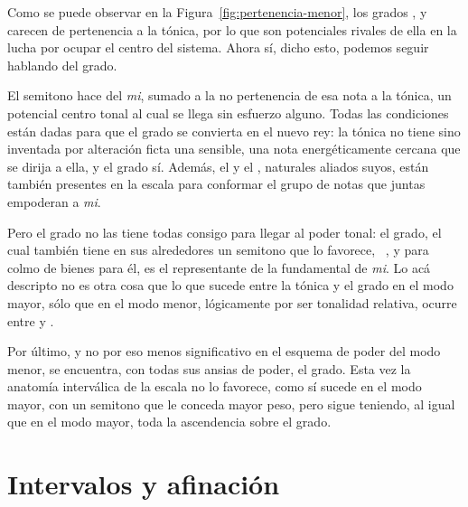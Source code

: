 \documentclass[a4paper,12pt]{article}
\begin{document}
\begin{multicols}{2}
    Como se puede observar en la Figura~\ref{fig:pertenencia-menor}, los grados ,  y  carecen de pertenencia a la tónica, por lo que son potenciales rivales de ella en la lucha por ocupar el centro del sistema. Ahora sí, dicho esto, podemos seguir hablando del  grado.

    El semitono  hace del \emph{mi\bemoltxt}, sumado a la no pertenencia de esa nota a la tónica, un potencial centro tonal al cual se llega sin esfuerzo alguno. Todas las condiciones están dadas para que el  grado se convierta en el nuevo rey: la tónica no tiene sino inventada por alteración ficta una sensible, una nota energéticamente cercana que se dirija a ella, y el  grado sí. Además, el  y el , naturales aliados suyos, están también presentes en la escala para conformar el grupo de notas  que juntas empoderan a \emph{mi\bemoltxt}.

    Pero el  grado no las tiene todas consigo para llegar al poder tonal: el  grado, el cual también tiene en sus alrededores un semitono que lo favorece, \hbox{ ,} y para colmo de bienes para él, es el representante de la fundamental de \emph{mi\bemoltxt}. Lo acá descripto no es otra cosa que lo que sucede entre la tónica y el  grado en el modo mayor, sólo que en el modo menor, lógicamente por ser tonalidad relativa, ocurre entre  y .

    Por último, y no por eso menos significativo en el esquema de poder del modo menor, se encuentra, con todas sus ansias de poder, el  grado. Esta vez la anatomía interválica de la escala no lo favorece, como sí sucede en el modo mayor, con un semitono que le conceda mayor peso, pero sigue teniendo, al igual que en el modo mayor, toda la ascendencia sobre el  grado.
  \section{Intervalos y afinación}\label{sec:intervalos-afinacion}


\end{multicols}
\end{document}
